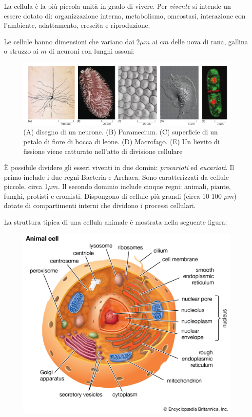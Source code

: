 La cellula è la più piccola unità in grado di vivere. Per \textit{vivente} si intende un essere dotato di: organizzazione interna, metabolismo, omeostasi, interazione con l'ambiente, adattamento, crescita e riproduzione.

\par Le cellule hanno dimensioni che variano dai 2$\mu m$ ai $cm$ delle uova di rana, gallina o struzzo ai $m$ di neuroni con lunghi assoni:

\begin{figure}[!h]
	\centering
	\includegraphics[scale=0.5] {images/cellule-dimensioni.png}
	\caption{(A) disegno di un neurone. (B) Paramecium. (C) superficie di un petalo di fiore di bocca di leone. (D) Macrofago. (E) Un lievito di fissione viene catturato nell'atto di divisione cellulare}
	\label{fig:cellule-dimensioni}
\end{figure}

\par È possibile dividere gli esseri viventi in due domini: \textit{procarioti} ed \textit{eucarioti}. Il primo include i due regni Bacteria e Archaea. Sono caratterizzati da cellule piccole, circa 1$\mu m$. Il secondo dominio include cinque regni: animali, piante, funghi, protisti e cromisti. Dispongono di cellule più grandi (circa 10-100 $\mu m$) dotate di compartimenti interni che dividono i processi cellulari.

La struttura tipica di una cellula animale è mostrata nella seguente figura:

\begin{figure}[!h]
	\centering
	\includegraphics[scale=0.2]{images/cellula-eucariotica.jpg}
\end{figure}

